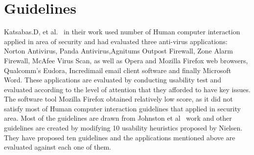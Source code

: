  \section{Guidelines}
 Katsabas.D, et al.~\cite{katsabas2005using} in their work used number of Human computer interaction applied in area of security and had evaluated three anti-virus applications: Norton Antivirus, Panda Antivirus,Agnitums Outpost Firewall, Zone Alarm Firewall, McAfee Virus Scan, as well as Opera and Mozilla Firefox web browsers, Qualcomm's Eudora, Incredimail email client software and finally Microsoft Word. These applications are evaluated by conducting usability test and evaluated according to the level of attention that they afforded to have key issues. The software tool Mozilla Firefox obtained relatively low score, as it did not satisfy most of Human computer interaction guidelines that applied in security area. Most of the guidelines are drawn from Johnston et al~\cite{johnston2003security} work and other guidelines are created by modifying 10 usability heuristics proposed by Nielsen. They have proposed ten guidelines  and the applications mentioned above are evaluated against each one of them.~\cite{katsabas2005using}
